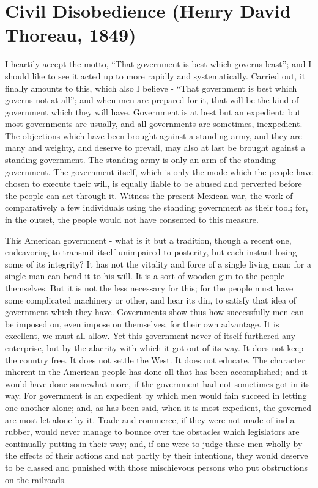 \documentclass[letterpaper,12pt,english]{sphinxmanual}
\begin{document}
\chapter{Civil Disobedience (Henry David Thoreau, 1849)}
\label{civil-disobedience::doc}\label{civil-disobedience:civil-disobedience-henry-david-thoreau-1849}
I heartily accept the motto, ``That government is best which governs least''; and I should like to see it acted up to more rapidly and systematically. Carried out, it finally amounts to this, which also I believe - ``That government is best which governs not at all''; and when men are prepared for it, that will be the kind of government which they will have. Government is at best but an expedient; but most governments are usually, and all governments are sometimes, inexpedient. The objections which have been brought against a standing army, and they are many and weighty, and deserve to prevail, may also at last be brought against a standing government. The standing army is only an arm of the standing government. The government itself, which is only the mode which the people have chosen to execute their will, is equally liable to be abused and perverted before the people can act through it. Witness the present Mexican war, the work of comparatively a few individuals using the standing government as their tool; for, in the outset, the people would not have consented to this measure.

This American government - what is it but a tradition, though a recent one, endeavoring to transmit itself unimpaired to posterity, but each instant losing some of its integrity? It has not the vitality and force of a single living man; for a single man can bend it to his will. It is a sort of wooden gun to the people themselves. But it is not the less necessary for this; for the people must have some complicated machinery or other, and hear its din, to satisfy that idea of government which they have. Governments show thus how successfully men can be imposed on, even impose on themselves, for their own advantage. It is excellent, we must all allow. Yet this government never of itself furthered any enterprise, but by the alacrity with which it got out of its way. It does not keep the country free. It does not settle the West. It does not educate. The character inherent in the American people has done all that has been accomplished; and it would have done somewhat more, if the government had not sometimes got in its way. For government is an expedient by which men would fain succeed in letting one another alone; and, as has been said, when it is most expedient, the governed are most let alone by it. Trade and commerce, if they were not made of india-rubber, would never manage to bounce over the obstacles which legislators are continually putting in their way; and, if one were to judge these men wholly by the effects of their actions and not partly by their intentions, they would deserve to be classed and punished with those mischievous persons who put obstructions on the railroads.
\end{document}
